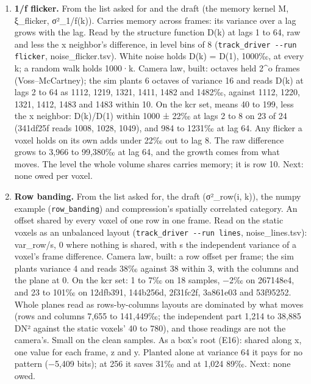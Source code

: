 \begin{enumerate}
\begin{itemize}
\item Prior art, cited from knowledge. The photon transfer method, reading gain, read noise and dark signal from the mean and variance of flat, dark and bias frames, and kTC noise removed by correlated double sampling: J. R. Janesick, “Photon Transfer: DN → λ”, SPIE Press, 2007.
\end{itemize}
\item \textbf{1/f flicker.} From the list asked for and the draft (the memory kernel M, ξ\_\allowbreak{}flicker, σ²\_\allowbreak{}1/f(k)). Carries memory across frames: its variance over a lag grows with the lag. Read by the structure function D(k) at lags 1 to 64, raw and less the x neighbor's difference, in level bins of 8 (\texttt{track\_\allowbreak{}driver -\allowbreak{}-\allowbreak{}run flicker}, noise\_\allowbreak{}flicker.tsv). White noise holds D(k) = D(1), 1000‰, at every k; a random walk holds 1000·k. Camera law, built: octaves held 2\textasciicircum{}o frames (Voss–McCartney); the sim plants 6 octaves of variance 16 and reads D(k) at lags 2 to 64 as 1112, 1219, 1321, 1411, 1482 and 1482‰, against 1112, 1220, 1321, 1412, 1483 and 1483 within 10. On the kcr set, means 40 to 199, less the x neighbor: D(k)/D(1) within 1000 ± 22‰ at lags 2 to 8 on 23 of 24 (341df25f reads 1008, 1028, 1049), and 984 to 1231‰ at lag 64. Any flicker a voxel holds on its own adds under 22‰ out to lag 8. The raw difference grows to 3,966 to 99,380‰ at lag 64, and the growth comes from what moves. The level the whole volume shares carries memory; it is row 10. Next: none owed per voxel.
\item \textbf{Row banding.} From the list asked for, the draft (σ²\_\allowbreak{}row(i, k)), the numpy example (\texttt{row\_\allowbreak{}banding}) and compression's spatially correlated category. An offset shared by every voxel of one row in one frame. Read on the static voxels as an unbalanced layout (\texttt{track\_\allowbreak{}driver -\allowbreak{}-\allowbreak{}run lines}, noise\_\allowbreak{}lines.tsv): var\_\allowbreak{}row/s, 0 where nothing is shared, with s the independent variance of a voxel's frame difference. Camera law, built: a row offset per frame; the sim plants variance 4 and reads 38‰ against 38 within 3, with the columns and the plane at 0. On the kcr set: 1 to 7‰ on 18 samples, −2‰ on 267148e4, and 23 to 101‰ on 12dfb391, 144b256d, 2f31fc2f, 3a861e03 and 53f95252. Whole planes read as rows-by-columns layouts are dominated by what moves (rows and columns 7,655 to 141,449‰; the independent part 1,214 to 38,885 DN² against the static voxels' 40 to 780), and those readings are not the camera's. Small on the clean samples. As a box's root (E16): shared along x, one value for each frame, z and y. Planted alone at variance 64 it pays for no pattern (−5,409 bits); at 256 it saves 31‰ and at 1,024 89‰. Next: none owed.

\end{enumerate}
